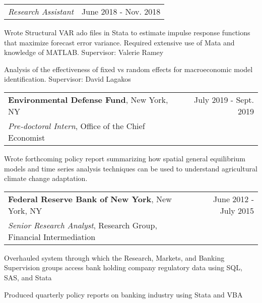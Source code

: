 \documentclass[10pt]{article}
\newcommand{\mysep}{\vspace{4pt}}
\begin{document}
\begin{blist}


\end{blist}
\mysep{}
\begin{tabularx}{\textwidth}{LR}
\emph{Research Assistant}
&
June 2018 - Nov. 2018
\end{tabularx}
\begin{blist}
\item Wrote Structural VAR ado files in Stata to estimate impulse response functions that maximize forecast error variance. Required extensive use of Mata and knowledge of MATLAB. Supervisor: Valerie Ramey
\item Analysis of the effectiveness of fixed vs random effects for macroeconomic model identification. Supervisor: David Lagakos
\end{blist}

\mysep{}
\begin{tabularx}{\textwidth}{LR}
\textbf{Environmental Defense Fund}, New York, NY 
&
July 2019 - Sept. 2019
\\
\emph{Pre-doctoral Intern}, Office of the Chief Economist
\end{tabularx}
\begin{blist}
\item Wrote forthcoming policy report summarizing how spatial general equilibrium models and time series analysis techniques can be used to understand agricultural climate change adaptation.
\end{blist}

\mysep{}
\begin{tabularx}{\textwidth}{LR}
\textbf{Federal Reserve Bank of New York}, New York, NY
& June 2012 - July 2015 
\\
\emph{Senior Research Analyst}, Research Group, Financial Intermediation
\end{tabularx}
\begin{blist}
\item Overhauled system through which the Research, Markets, and Banking Supervision groups access bank holding company regulatory data using SQL, SAS, and Stata
\item Produced quarterly policy reports on banking industry using Stata and VBA
\end{blist}
\end{document}
